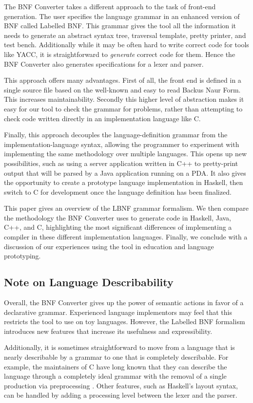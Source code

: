 \documentclass{llncs}
\begin{document}
The BNF Converter takes a different approach to the task of front-end
generation. The user specifies the language grammar in an enhanced
version of BNF called Labelled BNF. This grammar gives the
tool all the information it needs to generate an abstract syntax tree, traversal template, pretty printer, and test bench. Additionally while it may be often hard to write correct code for tools like YACC, it is straightforward to {\em generate} correct code for them. Hence the BNF Converter also generates specifications for a lexer and parser.

This approach offers many advantages. First of all, the front end is defined in a
single source file based on the well-known and easy to read Backus Naur Form. This increases maintainability. Secondly this higher level of abstraction makes it easy for our tool to check the grammar for problems, rather than attempting to check code written directly in an implementation language like C.

Finally, this approach decouples the language-definition grammar from the implementation-language syntax, allowing the programmer to
experiment with implementing the same methodology over multiple languages. This opens up new possibilities, such as using a server application written in C++ to pretty-print output that will be parsed by a Java application running on a PDA. It also gives the opportunity to create a prototype language implementation in Haskell, then switch to C for development once the language definition has been finalized.

This paper gives an overview of the LBNF grammar formalism. We then compare the methodology the BNF Converter uses to generate code in Haskell, Java, C++, and C, highlighting the most significant differences of implementing a compiler in these different implementation languages. Finally, we conclude with a discussion of our experiences using the tool in education and language prototyping.

\subsection{Note on Language Describability}
Overall, the BNF Converter gives up the power of semantic actions in favor of a declarative grammar. Experienced language implementors may feel that this restricts the tool to use on toy languages. However, the Labelled BNF formalism introduces new features that increase its usefulness and expressibility.

Additionally, it is sometimes straightforward to move from a language that is nearly describable by a grammar to one that is completely describable. For example, the maintainers of C have long known that they can describe the language through a completely ideal grammar with the removal of a single production via preprocessing \cite{Kern88}. Other features, such as Haskell's layout syntax, can be handled by adding a processing level between the lexer and the parser.
\end{document}
